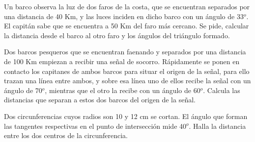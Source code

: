 \vspace{-8mm}
\begin{flushright}
\begin{footnotesize} \textcolor{gris}{}	\end{footnotesize}
\end{flushright}

\begin{mipropuesto}
	
	Un barco observa la luz de dos faros de la costa, que se encuentran separados por una distancia de 40 Km, y las luces inciden en dicho barco con un ángulo de 33$^o$. El capitán sabe que se encuentra a 50 Km del faro más cercano. Se pide, calcular la distancia desde el barco al otro faro y los ángulos del triángulo formado.
\end{mipropuesto}

\vspace{-8mm}
\begin{flushright}
\begin{footnotesize} \textcolor{gris}{}	\end{footnotesize}
\end{flushright}

\begin{mipropuesto}

Dos barcos pesqueros que se encuentran faenando y separados por una distancia de 100 Km empiezan a recibir una señal de socorro. Rápidamente se ponen en contacto los capitanes de ambos barcos para situar el origen de la señal, para ello trazan una línea entre ambos, y sobre esa línea uno de ellos recibe la señal con un ángulo de 70$^o$, mientras que el otro la recibe con un ángulo de 60$^o$. Calcula las distancias que separan a estos dos barcos del origen de la señal.
	
\end{mipropuesto}

\vspace{-8mm}
\begin{flushright}
\begin{footnotesize} \textcolor{gris}{}	\end{footnotesize}
\end{flushright}

\begin{mipropuesto}
	
	Dos circunferencias cuyos radios son 10 y 12 cm se cortan. El ángulo que forman las tangentes respectivas en el punto de intersección mide 40$^o$.  Halla la distancia entre los dos centros de la circunferencia.
\end{mipropuesto}

